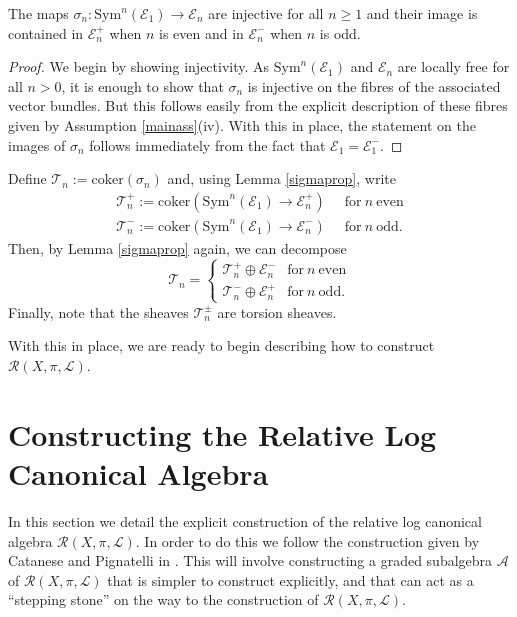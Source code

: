 \documentclass{amsart}
\begin{document}
\begin{lemma}\label{sigmaprop} The maps $\sigma_n\colon {\mathrm{Sym}}^n({\mathcal{E}}_1) \to {\mathcal{E}}_n$ are injective for all $n \geq 1$ and their image is contained in ${\mathcal{E}}_n^+$ when $n$ is even and in ${\mathcal{E}}_n^-$ when $n$ is odd.\end{lemma}
\begin{proof} We begin by showing injectivity. As ${\mathrm{Sym}}^n({\mathcal{E}}_1)$ and ${\mathcal{E}}_n$ are locally free for all $n > 0$, it is enough to show that $\sigma_n$ is injective on the fibres of the associated vector bundles. But this follows easily from the explicit description of these fibres given by Assumption \ref{mainass}(iv). With this in place, the statement on the images of $\sigma_n$ follows immediately from the fact that ${\mathcal{E}}_1 = {\mathcal{E}}_1^-$.
\end{proof}  

Define ${\mathcal{T}}_n := \mathrm{coker}(\sigma_n)$ and, using Lemma \ref{sigmaprop}, write
\begin{align*}
{\mathcal{T}}_n^+ := \mathrm{coker}({\mathrm{Sym}}^n({\mathcal{E}}_1) \to {\mathcal{E}}_n^+) &\ \,\, \mathrm{for} \ n \ \mathrm{even}\\
{\mathcal{T}}_n^- := \mathrm{coker}({\mathrm{Sym}}^n({\mathcal{E}}_1) \to {\mathcal{E}}_n^-) &\ \,\, \mathrm{for} \ n \ \mathrm{odd}.
\end{align*}
Then, by Lemma \ref{sigmaprop} again, we can decompose
\[{\mathcal{T}}_n = \left\{ \begin{array}{ll}	{\mathcal{T}}_n^+ \oplus {\mathcal{E}}_n^- & \mathrm{for} \ n \ \mathrm{even}\\
										{\mathcal{T}}_n^- \oplus {\mathcal{E}}_n^+ & \mathrm{for} \ n \ \mathrm{odd}. \end{array} \right. \]
Finally, note that the sheaves ${\mathcal{T}}^{\pm}_n$ are torsion sheaves.

With this in place, we are ready to begin describing how to construct ${\mathcal{R}}(X,\pi,{\mathcal{L}})$. 

\section{Constructing the Relative Log Canonical Algebra} \label{constructingR}

In this section we detail the explicit construction of the relative log canonical algebra ${\mathcal{R}}(X,\pi,{\mathcal{L}})$. In order to do this we follow the construction given by Catanese and Pignatelli in \cite{flgi}. This will involve constructing a graded subalgebra ${\mathcal{A}}$ of ${\mathcal{R}}(X,\pi,{\mathcal{L}})$ that is simpler to construct explicitly, and that can act as a ``stepping stone'' on the way to the construction of ${\mathcal{R}}(X,\pi,{\mathcal{L}})$.
\end{document}
